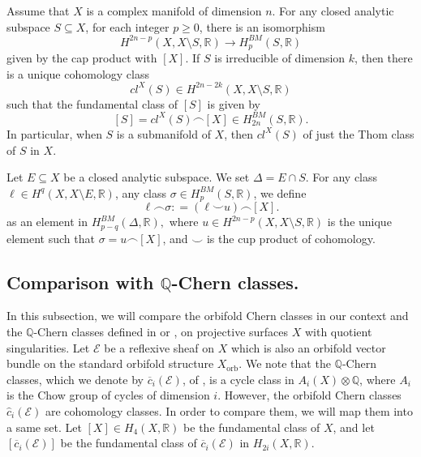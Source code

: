 \documentclass[12pt]{amsart}
\newcommand{\<}{\leq}
\def\>{\geq}
\def\mcE{\mathcal{E}}
\theoremstyle{remark}
\theoremstyle{definition}
\theoremstyle{definition}
\numberwithin{equation}{section}
\theoremstyle{definition}
\theoremstyle{definition}
\def\orb{\mathrm{orb}}
\begin{document}
Assume that $X$ is a complex manifold of dimension $n$. 
For any closed analytic subspace $S\subseteq X$, 
for each integer $p\>0$, there is an isomorphism 
\begin{equation}\label{eqn:BM-isomorphism}
H^{2n-p}(X, X\setminus S, \mathbb{R}) \to H^{BM}_p(S,\mathbb{R})
\end{equation}
given by the cap product with  $[X]$. 
If $S$ is irreducible of  dimension $k$, then  there is a unique cohomology class 
\[ cl^X(S) \in H^{2n-2k}(X,X\setminus S, \mathbb{R}) \]
such that the fundamental class of $[S]$ is given by 
\[[S] = cl^X(S) \smallfrown [X]   \in H^{BM}_{2n}(S, \mathbb{R}).\]  
In particular, when $S$ is a submanifold of $X$, then $cl^X(S)$ of just the Thom class of $S$ in $X$. 


Let  $E\subseteq X$ be a closed analytic subspace.  
We set $\Delta = E\cap S$. 
For any class $\ell\in H^{q}(X,X\setminus E, \mathbb{R})$, any class $\sigma\in H^{BM}_p(S, \mathbb{R})$, we define      
\begin{equation}
\ell \smallfrown  \sigma : =   (\ell \smallsmile  u) \smallfrown [X].
\end{equation} 
as an element in 
$H^{BM}_{p-q}(\Delta, \mathbb{R}),$ where $u\in H^{2n-p}(X, X\setminus S, \mathbb{R})$ is the unique element such that $\sigma= u \smallfrown [X]$, and $\smallsmile$ is the  cup product of cohomology. 
 
 
 

 




\subsection{Comparison with $\mathbb{Q}$-Chern classes.}

In this subsection, we will compare the orbifold Chern classes in our context and the $\mathbb{Q}$-Chern classes defined in \cite[Section 3]{Mumford83} or \cite[Chapter 10]{Kol92}, on projective surfaces $X$ with quotient singularities.   Let $\mcE$ be a reflexive sheaf on $X$ which is also an orbifold vector bundle on the standard orbifold structure $X_{\orb}$. 
We note that the $\mathbb{Q}$-Chern classes, which we denote by $\overline{c}_i(\mcE)$, of \cite[Chapter 10]{Kol92}, is a cycle class in $A_i(X)\otimes \mathbb{Q}$, where $A_i$ is the Chow group of cycles of dimension $i$. 
However, the orbifold Chern classes $\hat{c}_i(\mcE)$ are cohomology classes.  
In order to compare them, we will map them into a same set. 
Let $[X]\in H_{4}(X, \mathbb{R})$ be the fundamental class of $X$, and let $[\overline{c}_i(\mcE)]$ be the fundamental class  of $\overline{c}_i(\mcE)$ in $H_{2i}(X,\mathbb{R})$. 
\end{document}
